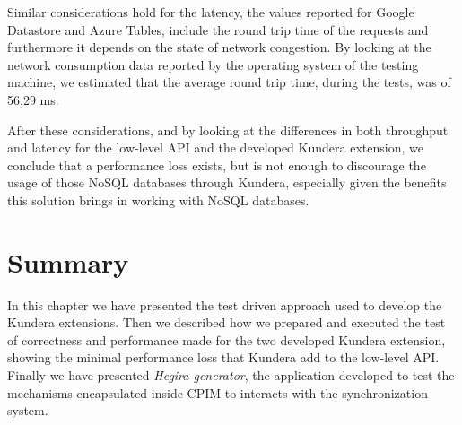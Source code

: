 \noindent Similar considerations hold for the latency, the values reported for Google Datastore and Azure Tables, include the round trip time of the requests and furthermore it depends on the state of network congestion. By looking at the network consumption data reported by the operating system of the testing machine, we estimated that the average round trip time, during the tests, was of 56,29 ms.

\newparagraph After these considerations, and by looking at the differences in both throughput and latency for the low-level API and the developed Kundera extension, we conclude that a performance loss exists, but is not enough to discourage the usage of those NoSQL databases through Kundera, especially given the benefits this solution brings in working with NoSQL databases.

\section{Summary}
In this chapter we have presented the test driven approach used to develop the Kundera extensions. Then we described how we prepared and executed the test of correctness and performance made for the two developed Kundera extension, showing the minimal performance loss that Kundera add to the low-level API.
Finally we have presented \textit{Hegira-generator}, the application developed to test the mechanisms encapsulated inside CPIM to interacts with the synchronization system.
